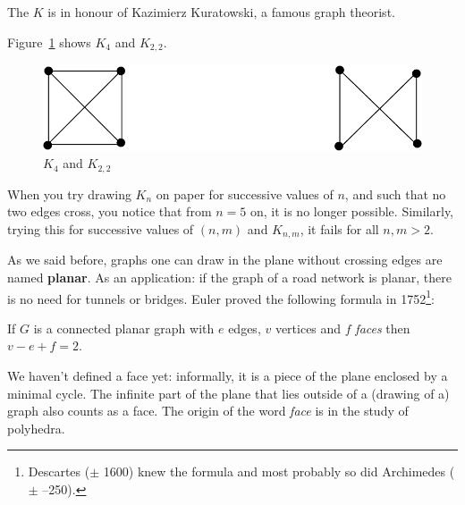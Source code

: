 The $K$ is in honour of Kazimierz Kuratowski, a famous graph theorist.

Figure~\ref{kuratowski1} shows $K_{4}$ and $K_{2,2}$.

\begin{figure}[ht]
\begin{center}
\includegraphics[width=0.4\linewidth,keepaspectratio]{kuratowski1}
\end{center}
\caption{$K_{4}$ and $K_{2,2}$ \label{kuratowski1}}
\end{figure}

When you try drawing $K_{n}$ on paper for successive values of $n$,
and such that no two edges cross, you notice that from $n=5$ on, it is
no longer possible. Similarly, trying this for successive values of
$(n,m)$ and $K_{n,m}$, it fails for all $n,m > 2$.

As we said before, graphs one can draw in the plane without crossing
edges are named \textbf{planar}. As an application: if the graph of a
road network is planar, there is no need for tunnels or bridges. Euler
proved the following formula in 1752\footnote{Descartes
($\pm$ 1600) knew the formula and most probably so did Archimedes
($\pm$ --250).}:

 \begin{theorem}
If $G$ is a connected planar graph with $e$ edges, $v$ vertices and
$f$ {\em faces} then $v-e+f = 2$.
\end{theorem}

We haven't defined a face yet: informally, it is a piece of the plane
enclosed by a minimal cycle. The infinite part of the plane
that lies outside of a (drawing of a) graph also counts as a face. The
origin of the word {\em face} is in the study of polyhedra.


